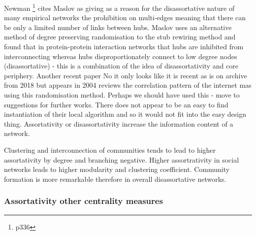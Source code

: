  


Newman \cite{newman2018networks}\footnote{p336} cites Maslov \cite{maslov2004detection} as giving as a reason for the disassortative nature of many empirical networks the prohibition on multi-edges meaning that there can be only a limited number of links between hubs. Maslov uses an alternative method of degree preserving randomisation to the stub rewiring method \cite{maslov2002specificity} and found that in protein-protein interaction networks that hubs are inhibited from interconnecting whereas hubs disproportionately connect to low degree nodes (disassortative) - this is a combination of the idea of disassortativity and core periphery. Another recent paper No it only looks like it is recent as is on archive from 2018 but appears in 2004 reviews the correlation pattern of the internet \cite{maslov2004detection} mas using this randomisation method. Perhaps we should have used this - move to suggestions for further works. There does not appear to be an easy to find instantiation of their local algorithm and so it would not fit into the easy design thing. 
Assortativity or disassortativity increase the information content of a network. 

Clustering and interconnection of communities tends to lead to higher assortativity by degree and branching negative\cite{estrada2011combinatorial}\cite{noldus2015assortativity}. Higher assortrativity in social networks leads to higher modularity and clustering coefficient\cite{noldus2015assortativity}. Community formation is more remarkable therefore in overall disassortative networks. 
%
%
%
\subsubsection{Assortativity other centrality measures}


